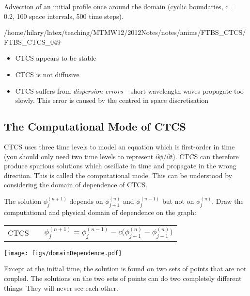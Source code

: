 \clearpage
{}

Advection of an initial profile once around the domain (cyclic boundaries, c = 0.2, 100 space intervals, 500 time steps).

{/home/hilary/latex/teaching/MTMW12/2012Notes/notes/anims/FTBS_CTCS/FTBS_CTCS_}{0}{49}

\begin{itemize}
\item CTCS appears to be stable
\item CTCS is not diffusive
\item CTCS suffers from {\it dispersion errors} -- short wavelength waves propagate too slowly. This error is caused by the centred in space discretisation
\end{itemize}

\clearpage
\subsection{The Computational Mode of CTCS}

CTCS uses three time levels to model an equation which is first-order in time (you should only need two time levels to represent $\partial\phi/\partial t$). CTCS can therefore produce spurious solutions which oscillate in time and propagate in the wrong direction. This is called the computational mode. This can be understood by considering the domain of dependence of CTCS.

The solution $\phi^{(n+1)}_{j}$ depends on $\phi^{(n)}_{j\pm 1}$ and $\phi^{(n-1)}_{j}$ but not on $\phi^{(n)}_{j}$. Draw the computational and physical domain of dependence on the graph:

\begin{tabular}{lcr}
CTCS && $\phi^{(n+1)}_j = 
\phi_j^{(n-1)} - c\bigl(\phi^{(n)}_{j+1} - \phi^{(n)}_{j-1}\bigr)$
\end{tabular}

\texttt{[image: figs/domainDependence.pdf]}

Except at the initial time, the solution is found on two sets of points that are not coupled. The solutions on the two sets of points can do two completely different things. They will never see each other.

